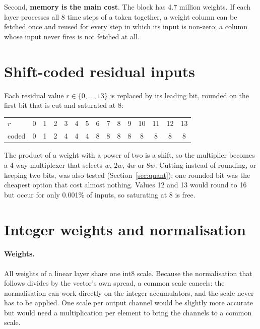 Second, \textbf{memory is the main cost}. The block has 4.7 million weights. If each layer processes all 8 time
steps of a token together, a weight column can be fetched once and reused for every step in which its input is
non-zero; a column whose input never fires is not fetched at all.

\section{Shift-coded residual inputs}

Each residual value $r \in \{0, \dots, 13\}$ is replaced by its leading bit, rounded on the first bit that is cut
and saturated at 8:
\begin{center}
\begin{tabular}{l*{14}{c}}
\toprule
$r$ & 0 & 1 & 2 & 3 & 4 & 5 & 6 & 7 & 8 & 9 & 10 & 11 & 12 & 13 \\
coded & 0 & 1 & 2 & 4 & 4 & 4 & 8 & 8 & 8 & 8 & 8 & 8 & 8 & 8 \\
\bottomrule
\end{tabular}
\end{center}
The product of a weight with a power of two is a shift, so the multiplier becomes a 4-way multiplexer that selects
$w$, $2w$, $4w$ or $8w$. Cutting instead of rounding, or keeping two bits, was also tested
(Section~\ref{sec:quant}); one rounded bit was the cheapest option that cost almost nothing. Values 12 and 13 would
round to 16 but occur for only 0.001\% of inputs, so saturating at 8 is free.

\section{Integer weights and normalisation}
\label{sec:intnorm}

\paragraph{Weights.} All weights of a linear layer share one int8 scale. Because the normalisation that follows
divides by the vector's own spread, a common scale cancels: the normalisation can work directly on the integer
accumulators, and the scale never has to be applied. One scale per output channel would be slightly more accurate
but would need a multiplication per element to bring the channels to a common scale.

